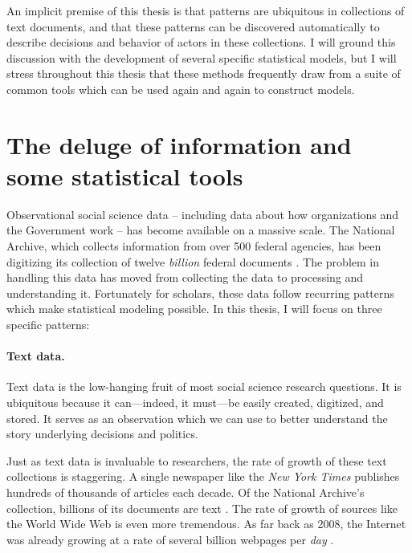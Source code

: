An implicit premise of this thesis is that patterns are ubiquitous in
collections of text documents, and that these patterns can be
discovered automatically to describe decisions and behavior of actors
in these collections.  I will ground this discussion with the
development of several specific statistical models, but I will stress
throughout this thesis that these methods frequently draw from a suite
of common tools which can be used again and again to construct models.

\section*{The deluge of information and some statistical tools}

Observational social science data -- including data about how
organizations and the Government work -- has become available on a
massive scale. The National Archive, which collects information from
over 500 federal agencies, has been digitizing its collection of
twelve \emph{billion} federal documents \citep{lazer:2009,
  national_archives:2012a,national_archives:2012b}.  The problem in
handling this data has moved from collecting the data to processing
and understanding it.  Fortunately for scholars, these data follow
recurring patterns which make statistical modeling possible. In this
thesis, I will focus on three specific patterns:

\paragraph{Text data.} Text data is the low-hanging fruit of most
social science research questions.  It is ubiquitous because it
can---indeed, it must---be easily created, digitized, and stored. It serves as an observation which we can use to better understand the
story underlying decisions and politics.

Just as text data is invaluable to researchers, the rate of growth of
these text collections is staggering.  A single newspaper like the
\emph{New York Times} publishes hundreds of thousands of articles each
decade.  Of the National Archive's collection, billions of its
documents are text
\citep{national_archives:2012a,national_archives:2012b}.  The rate of
growth of sources like the World Wide Web is even more tremendous.  As
far back as 2008, the Internet was already growing at a rate of
several billion webpages per \emph{day} \citep{googleblog:2008}.

